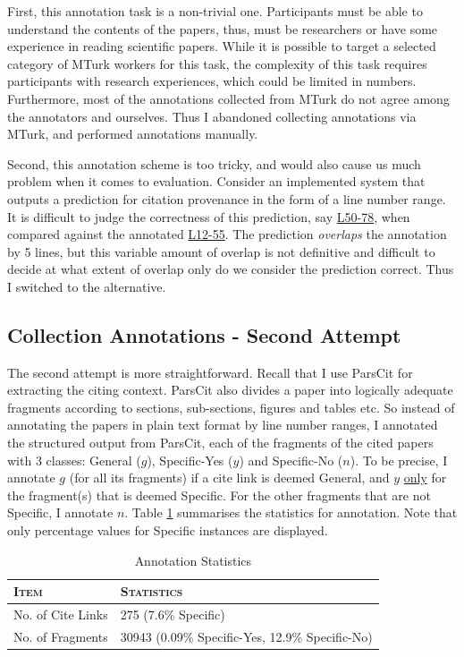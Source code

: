 First, this annotation task is a non-trivial one. Participants must be able to understand the contents of the papers, thus, must be researchers or have some experience in reading scientific papers. While it is possible to target a selected category of MTurk workers for this task, the complexity of this task requires participants with research experiences, which could be limited in numbers. Furthermore, most of the annotations collected from MTurk do not agree among the annotators and ourselves. Thus I abandoned collecting annotations via MTurk, and performed annotations manually.

Second, this annotation scheme is too tricky, and would also cause us much problem when it comes to evaluation. Consider an implemented system that outputs a prediction for citation provenance in the form of a line number range. It is difficult to judge the correctness of this prediction, say \url{L50-78}, when compared against the annotated \url{L12-55}. The prediction \textit{overlaps} the annotation by 5 lines, but this variable amount of overlap is not definitive and difficult to decide at what extent of overlap only do we consider the prediction correct. Thus I switched to the alternative.

\subsection{Collection Annotations - Second Attempt}
The second attempt is more straightforward. Recall that I use ParsCit for extracting the citing context. ParsCit also divides a paper into logically adequate fragments according to sections, sub-sections, figures and tables etc. So instead of annotating the papers in plain text format by line number ranges, I annotated the structured output from ParsCit, each of the fragments of the cited papers with 3 classes: General ($g$), Specific-Yes ($y$) and Specific-No ($n$). To be precise, I annotate $g$ (for all its fragments) if a cite link is deemed General, and $y$ \underline{only} for the fragment(s) that is deemed Specific. For the other fragments that are not Specific, I annotate $n$. Table \ref{tab:annotation} summarises the statistics for annotation. Note that only percentage values for Specific instances are displayed.

\begin{table}[h]
	\center
	\begin{tabular}{ l | l}
		\textsc{Item} & \textsc{Statistics}\\
		\hline
		No. of Cite Links & 275 (7.6\% Specific) \\
		No. of Fragments & 30943 (0.09\% Specific-Yes, 12.9\% Specific-No)
	\end{tabular}
	\caption{Annotation Statistics}
	\label{tab:annotation}
\end{table}

